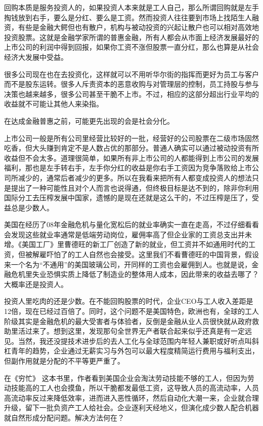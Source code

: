 \documentclass[
]{book}
\begin{document}
回购本质是服务投资人的，如果投资人本来就是工人自己，那么所谓回购就是左手掏钱放到右手，要么是分红、要么是工资。然而投资人往往要到市场上找陌生人融资，有些是金融大鳄但也有散户，机构与被动投资的兴起让散户也可以相对高效地投资股票。这就是金融学家所谓的普惠金融，所有人都会从市面上经济发展最好的上市公司的利润中得到回报，如果你工资不涨但股票一直分红，那么也算是从社会经济大发展中受益。

很多公司现在也在去投资化，这样就可以不用听华尔街的指挥而更好为员工与客户而不是股东运转。很多人斥责资本的恶意收购与对管理层的控制，员工持股与参与决策也越来越多，很多公司甚至干脆不上市。不过，相应的这部分超出行业平均的收益就不可能让其他人来染指。

在达成金融普惠之前，可能更先出现的会是社会分化。

上市公司一般是所有公司里经营比较好的一批，经营好的公司股票在二级市场固然吃香，但大头赚到肯定不是人数占优的那部分。普通人确实可以通过被动投资有所收益但不会太多。道理很简单，如果所有非上市公司的人都能得到上市公司的发展福利，那也是左手转右手，左手你分红的收益是你右手工资因为竞争落败给上市公司所减少的，通常后者减少的更多。所以在我看来把所有人都变成投资人的想法只是提出了一种可能性且对个人而言也说得通，但终极目标是达不到的，除非你利用国际分工去压榨发展中国家，遗憾的是现在还就是这么干的，不过压榨是压了，受益总是少数人。

美国在经历了08年金融危机与量化宽松后的就业率确实一直在走高，不过仔细看看会发现这些就业率通常是低端劳动岗位，雇佣率高了但企业家的工资总支出并未增。《美国工厂》里曹德旺的新工厂创造了新的就业，但工资并不如通用时代的工资，但被解雇吓怕了的工人自然也会接受。这里我们不看曹德旺的中国背景，假设来一个名为``不通用''的美国玻璃公司，开同样的工资也会雇佣到人。也就是说，金融危机里失业恐惧实质上降低了制造业的整体用人成本，因此带来的收益去哪了？大概率还是投资人。

投资人里吃肉的还是少数。在不能回购股票的时代，企业CEO与工人收入差距是12倍，现在已经过百倍了。同时，这个问题不是美国特色，欧洲也有，全球的工人阶级其实是金融危机的最大受害者与体验者，反倒是金融从业人员很快就从政府救助里活过来了。想到这里，发现那句全世界无产者联合起来似乎还真是有一定远见。当然，我还没提技术进步后的去人工化与全球范围内年轻人兼职或好听点叫斜杠青年的趋势，企业通过无薪实习与外包可以最大程度精简运行费用与福利支出，但副作用就是分配的不平等更严重了。

在《穷忙》 这本书里，作者看到美国企业会淘汰劳动技能不够的工人，但因为劳动技能高的工人也会摸鱼，所以干脆都发最低工资，这导致人员的高流动率，人员高流动率反过来降低效率，进而进入恶性循环，然后自动化大潮一来，企业就合理升级，留下一批负资产工人给社会。企业逐利天经地义，但演化成少数人配合机器就自然形成分配问题。解决方法何在？
\end{document}
